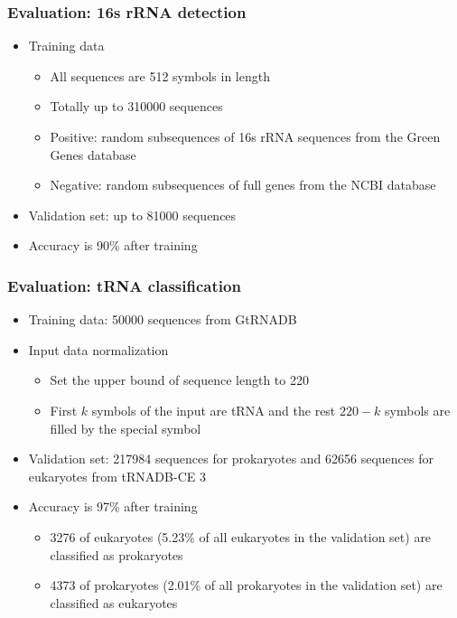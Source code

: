 \documentclass[xcolor=table]{beamer}
\begin{document}
\begin{frame} \frametitle{Evaluation: 16s rRNA detection}
\begin{itemize}
 \item Training data
 \begin{itemize}
   \item All sequences are 512 symbols in length
   \item Totally up to 310000 sequences
  \item Positive: random subsequences of 16s rRNA sequences from the Green Genes database
  \item Negative: random subsequences of full genes from the NCBI database
 \end{itemize}
\item Validation set: up to 81000 sequences
\item Accuracy is 90\% after training
\end{itemize}

\end{frame}

\begin{frame} \frametitle{Evaluation: tRNA classification}
\begin{itemize}
 \item Training data: 50000 sequences from GtRNADB
 \item Input data normalization
 \begin {itemize}
    \item Set the upper bound of sequence length to 220
    \item First $k$ symbols of the input are tRNA and the rest $220 - k$ symbols are filled by the special symbol
\end{itemize}

\item Validation set:  217984 sequences for prokaryotes and 62656 sequences for eukaryotes from tRNADB-CE 3
\item Accuracy is 97\% after training
\begin{itemize}
  \item 3276 of eukaryotes (5.23\% of all eukaryotes in the validation set) are classified as prokaryotes \item 4373 of prokaryotes (2.01\% of all prokaryotes in the validation set) are classified as eukaryotes
\end{itemize}

\end{itemize}

\end{frame}
\end{document}

